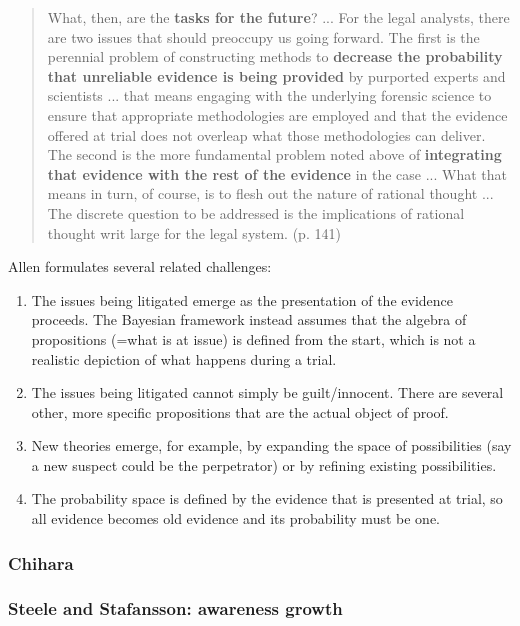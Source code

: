 \documentclass[
  11pt,
  dvipsnames,enabledeprecatedfontcommands]{scrartcl}
\begin{document}
\begin{quote}
What, then, are the \textbf{tasks for the future}? ... For the legal
analysts, there are two issues that should preoccupy us going forward. The first is the perennial problem
of constructing methods to \textbf{decrease the probability that unreliable evidence is being provided} by
purported experts and scientists ... that means engaging with the underlying forensic science to ensure that appropriate methodologies are employed and that the evidence offered at trial does not overleap what those methodologies can deliver. The second is the more fundamental problem noted above of \textbf{integrating that evidence with the rest of the evidence} in the case ... What that means in turn, of course, is to flesh out the nature of rational thought ... The discrete question to be addressed is the implications of rational thought writ large for the legal system. (p. 141) 
\end{quote}

Allen formulates several related challenges:

\begin{enumerate}
\def\labelenumi{\arabic{enumi}.}
\item
  The issues being litigated emerge as the presentation of the evidence
  proceeds. The Bayesian framework instead assumes that the algebra of
  propositions (=what is at issue) is defined from the start, which is
  not a realistic depiction of what happens during a trial.
\item
  The issues being litigated cannot simply be guilt/innocent. There are
  several other, more specific propositions that are the actual object
  of proof.
\item
  New theories emerge, for example, by expanding the space of
  possibilities (say a new suspect could be the perpetrator) or by
  refining existing possibilities.
\item
  The probability space is defined by the evidence that is presented at
  trial, so all evidence becomes old evidence and its probability must
  be one.
\end{enumerate}

\hypertarget{chihara}{%
\subsubsection{Chihara}\label{chihara}}

\hypertarget{steele-and-stafansson-awareness-growth}{%
\subsubsection{Steele and Stafansson: awareness
growth}\label{steele-and-stafansson-awareness-growth}}
\end{document}
